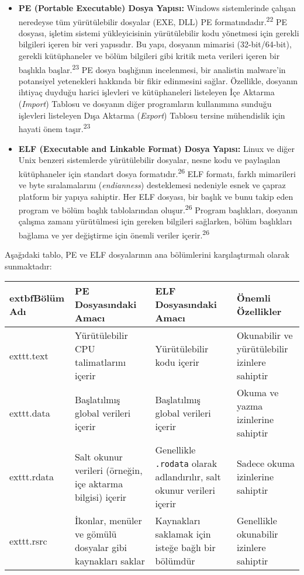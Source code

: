 \begin{itemize}
    \item \textbf{PE (Portable Executable) Dosya Yapısı:} Windows sistemlerinde çalışan neredeyse tüm yürütülebilir dosyalar (EXE, DLL) PE formatındadır.\textsuperscript{22} PE dosyası, işletim sistemi yükleyicisinin yürütülebilir kodu yönetmesi için gerekli bilgileri içeren bir veri yapısıdır. Bu yapı, dosyanın mimarisi (32-bit/64-bit), gerekli kütüphaneler ve bölüm bilgileri gibi kritik meta verileri içeren bir başlıkla başlar.\textsuperscript{23} PE dosya başlığının incelenmesi, bir analistin malware'in potansiyel yetenekleri hakkında bir fikir edinmesini sağlar. Özellikle, dosyanın ihtiyaç duyduğu harici işlevleri ve kütüphaneleri listeleyen İçe Aktarma (\textit{Import}) Tablosu ve dosyanın diğer programların kullanımına sunduğu işlevleri listeleyen Dışa Aktarma (\textit{Export}) Tablosu tersine mühendislik için hayati önem taşır.\textsuperscript{23}
    \item \textbf{ELF (Executable and Linkable Format) Dosya Yapısı:} Linux ve diğer Unix benzeri sistemlerde yürütülebilir dosyalar, nesne kodu ve paylaşılan kütüphaneler için standart dosya formatıdır.\textsuperscript{26} ELF formatı, farklı mimarileri ve byte sıralamalarını (\textit{endianness}) desteklemesi nedeniyle esnek ve çapraz platform bir yapıya sahiptir. Her ELF dosyası, bir başlık ve bunu takip eden program ve bölüm başlık tablolarından oluşur.\textsuperscript{26} Program başlıkları, dosyanın çalışma zamanı yürütülmesi için gereken bilgileri sağlarken, bölüm başlıkları bağlama ve yer değiştirme için önemli veriler içerir.\textsuperscript{26}
\end{itemize}

Aşağıdaki tablo, PE ve ELF dosyalarının ana bölümlerini karşılaştırmalı olarak sunmaktadır:

\begin{longtable}{|l|p{3.5cm}|p{3.5cm}|p{3.5cm}|}
\hline
	extbf{Bölüm Adı} & \textbf{PE Dosyasındaki Amacı} & \textbf{ELF Dosyasındaki Amacı} & \textbf{Önemli Özellikler} \\
\hline
	exttt{.text} & Yürütülebilir CPU talimatlarını içerir & Yürütülebilir kodu içerir & Okunabilir ve yürütülebilir izinlere sahiptir \\
\hline
	exttt{.data} & Başlatılmış global verileri içerir & Başlatılmış global verileri içerir & Okuma ve yazma izinlerine sahiptir \\
\hline
	exttt{.rdata} & Salt okunur verileri (örneğin, içe aktarma bilgisi) içerir & Genellikle \texttt{.rodata} olarak adlandırılır, salt okunur verileri içerir & Sadece okuma izinlerine sahiptir \\
\hline
	exttt{.rsrc} & İkonlar, menüler ve gömülü dosyalar gibi kaynakları saklar & Kaynakları saklamak için isteğe bağlı bir bölümdür & Genellikle okunabilir izinlere sahiptir \\
\hline
\end{longtable}

